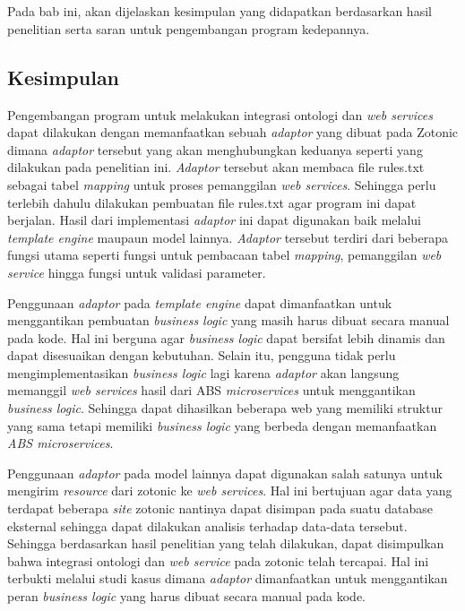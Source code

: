 \chapter{\babEnam}
Pada bab ini, akan dijelaskan kesimpulan yang didapatkan berdasarkan hasil penelitian serta saran untuk pengembangan program kedepannya.
\section{Kesimpulan}
Pengembangan program untuk melakukan integrasi ontologi dan \textit{web services} dapat dilakukan dengan memanfaatkan sebuah \textit{adaptor} yang dibuat pada Zotonic dimana \textit{adaptor} tersebut yang akan menghubungkan keduanya seperti yang dilakukan pada penelitian ini. \textit{Adaptor} tersebut akan membaca file rules.txt sebagai tabel \textit{mapping} untuk proses pemanggilan \textit{web services}. Sehingga perlu terlebih dahulu dilakukan pembuatan file rules.txt agar program ini dapat berjalan. Hasil dari implementasi \textit{adaptor} ini dapat digunakan baik melalui \textit{template engine} maupaun model lainnya. \textit{Adaptor} tersebut terdiri dari beberapa fungsi utama seperti fungsi untuk pembacaan tabel \textit{mapping}, pemanggilan \textit{web service} hingga fungsi untuk validasi parameter.

Penggunaan \textit{adaptor} pada \textit{template engine} dapat dimanfaatkan untuk menggantikan pembuatan \textit{business logic} yang masih harus dibuat secara manual pada kode. Hal ini berguna agar \textit{business logic} dapat bersifat lebih dinamis dan dapat disesuaikan dengan kebutuhan. Selain itu, pengguna tidak perlu mengimplementasikan \textit{business logic} lagi karena \textit{adaptor} akan langsung memanggil \textit{web services} hasil dari ABS \textit{microservices} untuk menggantikan \textit{business logic}. Sehingga dapat dihasilkan beberapa web yang memiliki struktur yang sama tetapi memiliki \textit{business logic} yang berbeda dengan memanfaatkan \textit{ABS microservices}.

Penggunaan \textit{adaptor} pada model lainnya dapat digunakan salah satunya untuk mengirim \textit{resource} dari zotonic ke \textit{web services}. Hal ini bertujuan agar data yang terdapat beberapa \textit{site} zotonic nantinya dapat disimpan pada suatu database eksternal sehingga dapat dilakukan analisis terhadap data-data tersebut. Sehingga berdasarkan hasil penelitian yang telah dilakukan, dapat disimpulkan bahwa integrasi ontologi dan \textit{web service} pada zotonic telah tercapai. Hal ini terbukti melalui studi kasus dimana \textit{adaptor} dimanfaatkan untuk menggantikan peran \textit{business logic} yang harus dibuat secara manual pada kode.
